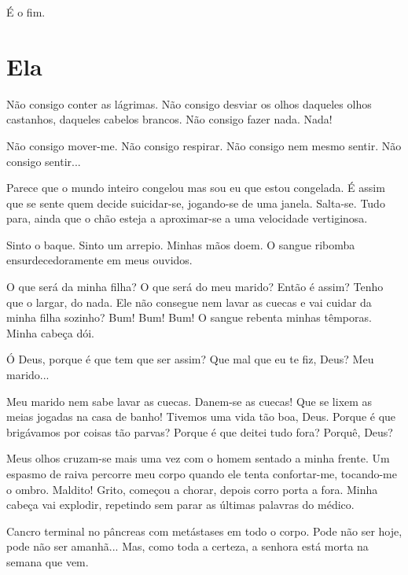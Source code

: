 \documentclass{creativeWriting}
\begin{document}
 É o fim.

\section{Ela}

Não consigo conter as lágrimas. Não consigo desviar os olhos daqueles olhos castanhos, daqueles cabelos brancos. Não consigo fazer nada. Nada!

Não consigo mover-me. Não consigo respirar. Não consigo nem mesmo sentir. Não consigo sentir...

Parece que o mundo inteiro congelou mas sou eu que estou congelada. É assim que se sente quem decide suicidar-se, jogando-se de uma janela. Salta-se. Tudo para, ainda que o chão esteja a aproximar-se a uma velocidade vertiginosa.

Sinto o baque. Sinto um arrepio. Minhas mãos doem. O sangue ribomba ensurdecedoramente em meus ouvidos.

O que será da minha filha? O que será do meu marido? Então é assim? Tenho que o largar, do nada. Ele não consegue nem lavar as cuecas e vai cuidar da minha filha sozinho? Bum! Bum! Bum! O sangue rebenta minhas têmporas. Minha cabeça dói.

Ó Deus, porque é que tem que ser assim? Que mal que eu te fiz, Deus? Meu marido...

Meu marido nem sabe lavar as cuecas. Danem-se as cuecas! Que se lixem as meias jogadas na casa de banho! Tivemos uma vida tão boa, Deus. Porque é que brigávamos por coisas tão parvas? Porque é que deitei tudo fora? Porquê, Deus?

Meus olhos cruzam-se mais uma vez com o homem sentado a minha frente. Um espasmo de raiva percorre meu corpo quando ele tenta confortar-me, tocando-me o ombro. Maldito! Grito, começou a chorar, depois corro porta a fora. Minha cabeça vai explodir, repetindo sem parar as últimas palavras do médico.

Cancro terminal no pâncreas com metástases em todo o corpo. Pode não ser hoje, pode não ser amanhã... Mas, como toda a certeza, a senhora está morta na semana que vem.
\end{document}
